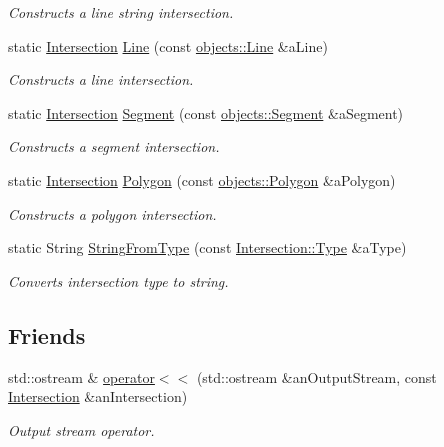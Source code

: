 \begin{DoxyCompactItemize}
\begin{DoxyCompactList}\small\item\em Constructs a line string intersection. \end{DoxyCompactList}\item 
static \hyperlink{classostk_1_1math_1_1geom_1_1d2_1_1_intersection}{Intersection} \hyperlink{classostk_1_1math_1_1geom_1_1d2_1_1_intersection_a536bc73bc0e02fecc86c6f31d7bf77e0}{Line} (const \hyperlink{classostk_1_1math_1_1geom_1_1d2_1_1objects_1_1_line}{objects\+::\+Line} \&a\+Line)
\begin{DoxyCompactList}\small\item\em Constructs a line intersection. \end{DoxyCompactList}\item 
static \hyperlink{classostk_1_1math_1_1geom_1_1d2_1_1_intersection}{Intersection} \hyperlink{classostk_1_1math_1_1geom_1_1d2_1_1_intersection_a6bb661360b82d21556a832506eea0c16}{Segment} (const \hyperlink{classostk_1_1math_1_1geom_1_1d2_1_1objects_1_1_segment}{objects\+::\+Segment} \&a\+Segment)
\begin{DoxyCompactList}\small\item\em Constructs a segment intersection. \end{DoxyCompactList}\item 
static \hyperlink{classostk_1_1math_1_1geom_1_1d2_1_1_intersection}{Intersection} \hyperlink{classostk_1_1math_1_1geom_1_1d2_1_1_intersection_ae0e221d32a983ada797341ee135dbd5b}{Polygon} (const \hyperlink{classostk_1_1math_1_1geom_1_1d2_1_1objects_1_1_polygon}{objects\+::\+Polygon} \&a\+Polygon)
\begin{DoxyCompactList}\small\item\em Constructs a polygon intersection. \end{DoxyCompactList}\item 
static String \hyperlink{classostk_1_1math_1_1geom_1_1d2_1_1_intersection_a745e7e2a6986dc19ab955e6b6f288af2}{String\+From\+Type} (const \hyperlink{classostk_1_1math_1_1geom_1_1d2_1_1_intersection_a8712ffbb37647ed5212ff8ba6da68b00}{Intersection\+::\+Type} \&a\+Type)
\begin{DoxyCompactList}\small\item\em Converts intersection type to string. \end{DoxyCompactList}\end{DoxyCompactItemize}
\subsection*{Friends}
\begin{DoxyCompactItemize}
\item 
std\+::ostream \& \hyperlink{classostk_1_1math_1_1geom_1_1d2_1_1_intersection_a8ff783039001be6a871338148f4f2919}{operator$<$$<$} (std\+::ostream \&an\+Output\+Stream, const \hyperlink{classostk_1_1math_1_1geom_1_1d2_1_1_intersection}{Intersection} \&an\+Intersection)
\begin{DoxyCompactList}\small\item\em Output stream operator. \end{DoxyCompactList}\end{DoxyCompactItemize}


